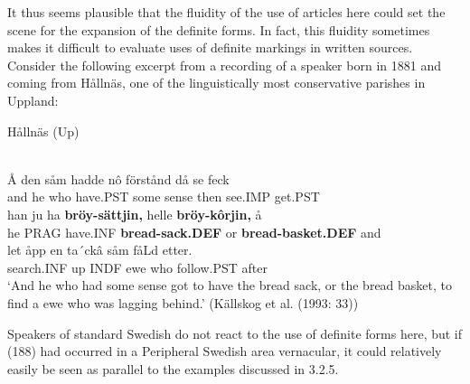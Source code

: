 \z

It thus seems plausible that the fluidity of the use of articles here could set the scene for the expansion of the definite forms. In fact, this fluidity sometimes makes it difficult to evaluate uses of definite markings in written sources. Consider the following excerpt from a recording of a speaker born in 1881 and coming from Hållnäs, one of the linguistically most conservative parishes in Uppland:


\item 

\label{bkm:Ref123725093}Hållnäs (Up)



 \ea\label{}
\\

 \ea\label{}
\gll Å  den  såm  hadde  nô  förstånd  då  se  feck\\


and  he  who  have.PST  some  sense  then  see.IMP  get.PST\\

 \ea\label{}
\gll han  ju  ha  \textbf{bröy-sättjin,} helle  \textbf{bröy-kôrjin,} å\\


he  PRAG  have.INF  \textbf{bread-sack.DEF} or  \textbf{bread-basket.DEF} and\\

 \ea\label{}
\gll le{\textasciigrave}t  åpp  en  ta´ckâ  såm  fåLd  etter.\\


search.INF  up  INDF  ewe  who  follow.PST  after\\

\glt  ‘And he who had some sense got to have the bread sack, or the bread basket, to find a ewe who was lagging behind.’ (Källskog et al. (1993: 33))

\z

Speakers of standard Swedish do not react to the use of definite forms here, but if (188) had occurred in a Peripheral Swedish area vernacular, it could relatively easily be seen as parallel to the examples discussed in 3.2.5.

